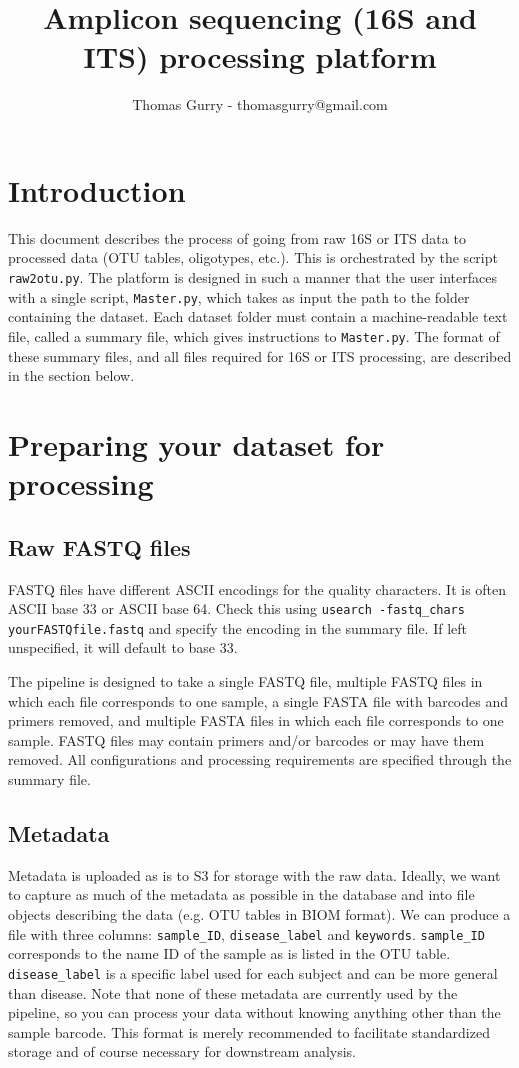 \documentclass[11pt, oneside]{article}   	%
\title{Amplicon sequencing (16S and ITS) processing platform}
\author{Thomas Gurry - thomasgurry@gmail.com}
\date{}							%
\begin{document}
\maketitle
\section{Introduction}
This document describes the process of going from raw 16S or ITS data to processed data (OTU tables, oligotypes, etc.).  This is orchestrated by the script {\tt raw2otu.py}.  The platform is designed in such a manner that the user interfaces with a single script, {\tt Master.py}, which takes as input the path to the folder containing the dataset.  Each dataset folder must contain a machine-readable text file, called a summary file, which gives instructions to {\tt Master.py}.  The format of these summary files, and all files required for 16S or ITS processing, are described in the section below.

\section{Preparing your dataset for processing}
\subsection{Raw FASTQ files}
FASTQ files have different ASCII encodings for the quality characters.  It is often ASCII base 33 or ASCII base 64.  Check this using {\tt usearch -fastq\_chars yourFASTQfile.fastq} and specify the encoding in the summary file.  If left unspecified, it will default to base 33.

The pipeline is designed to take a single FASTQ file, multiple FASTQ files in which each file corresponds to one sample, a single FASTA file with barcodes and primers removed, and multiple FASTA files in which each file corresponds to one sample. FASTQ files may contain primers and/or barcodes or may have them removed. All configurations and processing requirements are specified through the summary file.

\subsection{Metadata}
Metadata is uploaded as is to S3 for storage with the raw data.  Ideally, we want to capture as much of the metadata as possible in the database and into file objects describing the data (e.g. OTU tables in BIOM format).  We can produce a file with three columns: {\tt sample\_ID}, {\tt disease\_label} and {\tt keywords}.  {\tt sample\_ID} corresponds to the name ID of the sample as is listed in the OTU table.  {\tt disease\_label} is a specific label used for each subject and can be more general than disease.  Note that none of these metadata are currently used by the pipeline, so you can process your data without knowing anything other than the sample barcode.  This format is merely recommended to facilitate standardized storage and of course necessary for downstream analysis.
\end{document}
